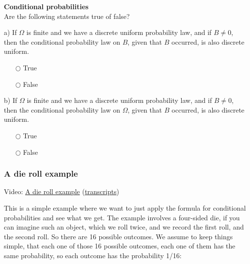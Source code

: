 \documentclass[pdftex, brazil, 12pt, twoside]{article}
\begin{document}
\begin{exercise}
  \textbf{Conditional probabilities}\\
  Are the following statements true of false?

  a) If $\Omega$ is finite and we have a discrete uniform probability law, and if
  $B \ne 0$, then the conditional probability law on $B$, given that $B$ occurred,
  is also discrete uniform.
  \begin{itemize}[noitemsep]
  \item[$\bigcirc$] True
  \item[$\bigcirc$] False
  \end{itemize}

  b) If $\Omega$ is finite and we have a discrete uniform probability law, and if
  $B \ne 0$, then the conditional probability law on $\Omega$, given that $B$ occurred,
  is also discrete uniform.
  \begin{itemize}[noitemsep]
  \item[$\bigcirc$] True
  \item[$\bigcirc$] False
  \end{itemize}
\end{exercise}

\subsubsection{A die roll example}
\label{un2-lec2-die-roll-example}

Video: \href{https://www.youtube.com/watch?v=snQLH-KzpLY}{A die roll example}
(\href{Unit-2/01\_lecture\_2/l02\_4\_transcripts.pdf}{transcripts})

This is a simple example where we want to just apply the
formula for conditional probabilities
and see what we get.
The example involves a four-sided die, if you can
imagine such an object, which we roll twice, and we record
the first roll, and the second roll.
So there are 16 possible outcomes.
We assume to keep things simple, that each one of those
16 possible outcomes, each one of them has the same
probability, so each outcome has the probability 1/16:
\end{document}

